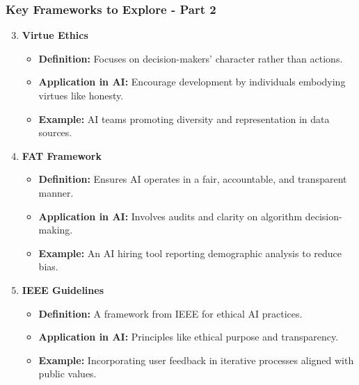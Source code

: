 \documentclass{beamer}
\begin{document}
\begin{frame}[fragile]
    \frametitle{Key Frameworks to Explore - Part 2}
    \begin{enumerate}
        \setcounter{enumi}{2} %
        \item \textbf{Virtue Ethics}
            \begin{itemize}
                \item \textbf{Definition:} Focuses on decision-makers' character rather than actions.
                \item \textbf{Application in AI:} Encourage development by individuals embodying virtues like honesty.
                \item \textbf{Example:} AI teams promoting diversity and representation in data sources.
            \end{itemize}
        
        \item \textbf{FAT Framework}
            \begin{itemize}
                \item \textbf{Definition:} Ensures AI operates in a fair, accountable, and transparent manner.
                \item \textbf{Application in AI:} Involves audits and clarity on algorithm decision-making.
                \item \textbf{Example:} An AI hiring tool reporting demographic analysis to reduce bias.
            \end{itemize}
        
        \item \textbf{IEEE Guidelines}
            \begin{itemize}
                \item \textbf{Definition:} A framework from IEEE for ethical AI practices.
                \item \textbf{Application in AI:} Principles like ethical purpose and transparency.
                \item \textbf{Example:} Incorporating user feedback in iterative processes aligned with public values.
            \end{itemize}
    \end{enumerate}
\end{frame}
\end{document}
